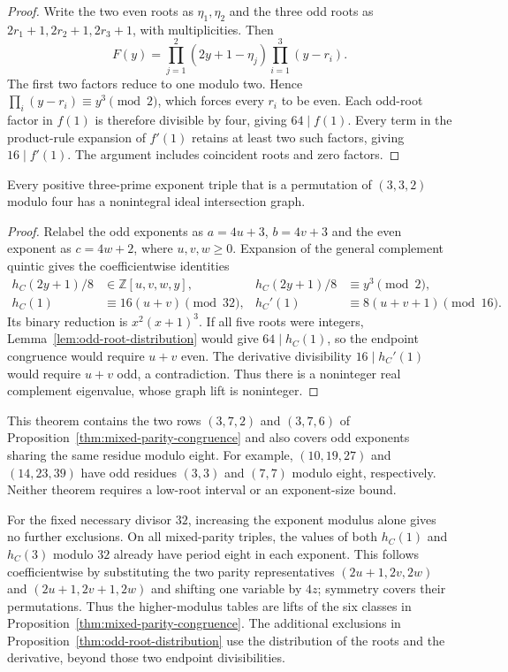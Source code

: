 \begin{proof}
Write the two even roots as $\eta_1,\eta_2$ and the three odd
roots as $2r_1+1,2r_2+1,2r_3+1$, with multiplicities. Then
\[
 F(y)=\prod_{j=1}^2(2y+1-\eta_j)\prod_{i=1}^3(y-r_i).
\]
The first two factors reduce to one modulo two. Hence
$\prod_i(y-r_i)\equiv y^3\pmod2$, which forces every $r_i$ to be even.
Each odd-root factor in $f(1)$ is therefore divisible by four,
giving $64\mid f(1)$. Every term in the product-rule expansion of
$f'(1)$ retains at least two such factors, giving $16\mid f'(1)$.
The argument includes coincident roots and zero factors.
\end{proof}

\begin{proposition}
\label{thm:odd-root-distribution}
Every positive three-prime exponent triple that is a permutation of
$(3,3,2)$ modulo four has a nonintegral ideal intersection graph.
\end{proposition}

\begin{proof}
Relabel the odd exponents as $a=4u+3$, $b=4v+3$ and the even
exponent as $c=4w+2$, where $u,v,w\geq0$. Expansion of the
general complement quintic gives the coefficientwise identities
\begin{align*}
 h_C(2y+1)/8&\in\mathbb Z[u,v,w,y], &
 h_C(2y+1)/8&\equiv y^3\pmod2,\\
 h_C(1)&\equiv16(u+v)\pmod{32}, &
 h_C'(1)&\equiv8(u+v+1)\pmod{16}.
\end{align*}
Its binary reduction is $x^2(x+1)^3$. If all five roots were integers,
Lemma~\ref{lem:odd-root-distribution} would give $64\mid h_C(1)$,
so the endpoint congruence would require $u+v$ even. The derivative
divisibility $16\mid h_C'(1)$ would require $u+v$ odd, a contradiction.
Thus there is a noninteger real complement eigenvalue, whose graph
lift is noninteger.
\end{proof}

This theorem contains the two rows $(3,7,2)$ and $(3,7,6)$ of
Proposition~\ref{thm:mixed-parity-congruence} and also covers odd exponents
sharing the same residue modulo eight. For example, $(10,19,27)$ and
$(14,23,39)$ have odd residues $(3,3)$ and $(7,7)$ modulo eight,
respectively. Neither theorem requires a low-root interval or an
exponent-size bound.

For the fixed necessary divisor $32$, increasing the exponent modulus
alone gives no further exclusions. On all mixed-parity triples, the
values of both $h_C(1)$ and $h_C(3)$ modulo $32$ already have period
eight in each exponent. This follows coefficientwise by substituting
the two parity representatives $(2u+1,2v,2w)$ and $(2u+1,2v+1,2w)$
and shifting one variable by $4z$; symmetry covers their permutations.
Thus the higher-modulus tables are lifts of the six classes in
Proposition~\ref{thm:mixed-parity-congruence}. The additional exclusions in
Proposition~\ref{thm:odd-root-distribution} use the distribution of the roots
and the derivative, beyond those two endpoint divisibilities.

